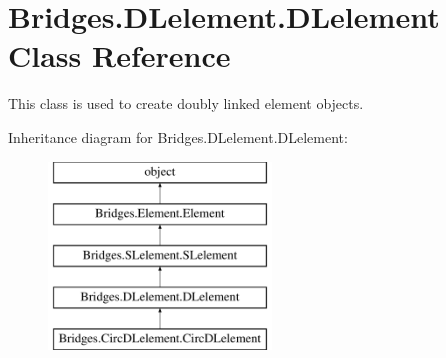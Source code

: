 \hypertarget{class_bridges_1_1_d_lelement_1_1_d_lelement}{}\section{Bridges.\+D\+Lelement.\+D\+Lelement Class Reference}
\label{class_bridges_1_1_d_lelement_1_1_d_lelement}


This class is used to create doubly linked element objects.  


Inheritance diagram for Bridges.\+D\+Lelement.\+D\+Lelement\+:\begin{figure}[H]
\begin{center}
\leavevmode
\includegraphics[height=5.000000cm]{class_bridges_1_1_d_lelement_1_1_d_lelement}
\end{center}
\end{figure}
